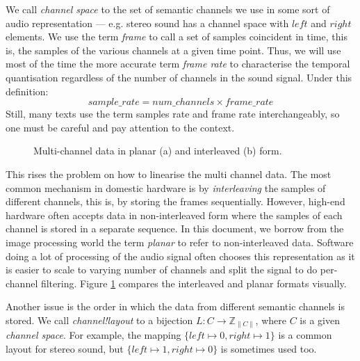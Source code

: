 We call \emph{channel space} to the set of
semantic channels we use in some sort of audio representation ---
e.g. stereo sound has a channel space with $left$ and $right$
elements. We use the term \emph{frame} to call a
set of samples coincident in time, this is, the samples of the various
channels at a given time point. Thus, we will use most of the time the
more accurate term \emph{frame rate} to characterise
the temporal quantisation regardless of the number of channels in the
sound signal. Under this definition:
\begin{equation}
sample\_rate = num\_channels \times frame\_rate
\end{equation}
Still, many texts use the term samples rate and frame rate
interchangeably, so one must be careful and pay attention to the
context.

\begin{figure}[h]
  \centering
  \;
  \caption{Multi-channel data in planar (a) and interleaved (b) form.}
  \label{fig:interleaving}
\end{figure}

This rises the problem on how to linearise the multi channel data. The
most common mechanism in domestic hardware is by
\emph{interleaving} the samples of different
channels, this is, by storing the frames sequentially. However,
high-end hardware often accepts data in non-interleaved form where the
samples of each channel is stored in a separate sequence. In this
document, we borrow from the image processing world the term
\emph{planar} to refer to
non-interleaved data. Software doing a lot of processing of the audio
signal often chooses this representation as it is easier to scale to
varying number of channels and split the signal to do per-channel
filtering. Figure \ref{fig:interleaving} compares the
interleaved and planar formats visually.

Another issue is the order in which the data from different semantic
channels is stored. We call 
\emph{channel!layout} to a bijection $L : C \rightarrow
\mathbb{Z}_{\|C\|}$, where $C$ is a given \emph{channel space}. For
example, the mapping $\{ left \mapsto 0, right \mapsto 1 \}$ is a
common layout for stereo sound, but $\{ left \mapsto 1, right \mapsto
0 \}$ is sometimes used too.

